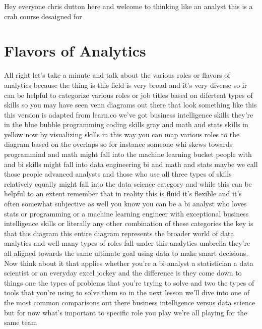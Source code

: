Hey everyone chris dutton here and welcome to thinking like an analyst this is a crah course desaigned for

\section{Flavors of Analytics}

All right let's take a minute and talk about the various roles or flavors of analytics because the thing is this field
is very broad and it's very diverse so ir can be helpful to categorize various roles or job titles
based on difertent types of skills so you may have seen venn diagrams out there that look something like this
this version is adapted from learn.co we've got business intelligence skills they're in the blue bubble programming coding skills gray and math  and stats skills in yellow now by
visualizing skills in this way you can map various roles to the diagram based on the overlaps so for instance someone
whi skews towards programmind and math might fall into the machine learning bucket people with and bi skills might fall into data engineering
bi and math and stats maybe we call those people advanced analysts and those who use all three types of skills
relatively equally might fall into the data science category and while this can be helpful to an extent remember that in reality this is fluid
it's flexible and it's often somewhat subjective as well you know you can be a bi analyst who loves stats or programming or a machine
learning engineer with exceptional business intelligence skills or literally any other combination of these categories the key is that this diagram this entire
diagram represents the broader world of data analytics and well many types of roles fall under this analytics umbrella they're
all aligned towards the same ultimate goal using data to make smart decisions. Now think about it that applies whether you're a bi analyst
a statistician a data scientist or an everyday excel jockey and the difference is they come down to things one the types of problems that you're trying to solve
and two the types of tools that you're  using to solve them so in the next lesson we'll dive into one of the most common comparisons out 
there business intelligence versus data  science but for now what's important to specific role you play we're all playing 
for the same team 



